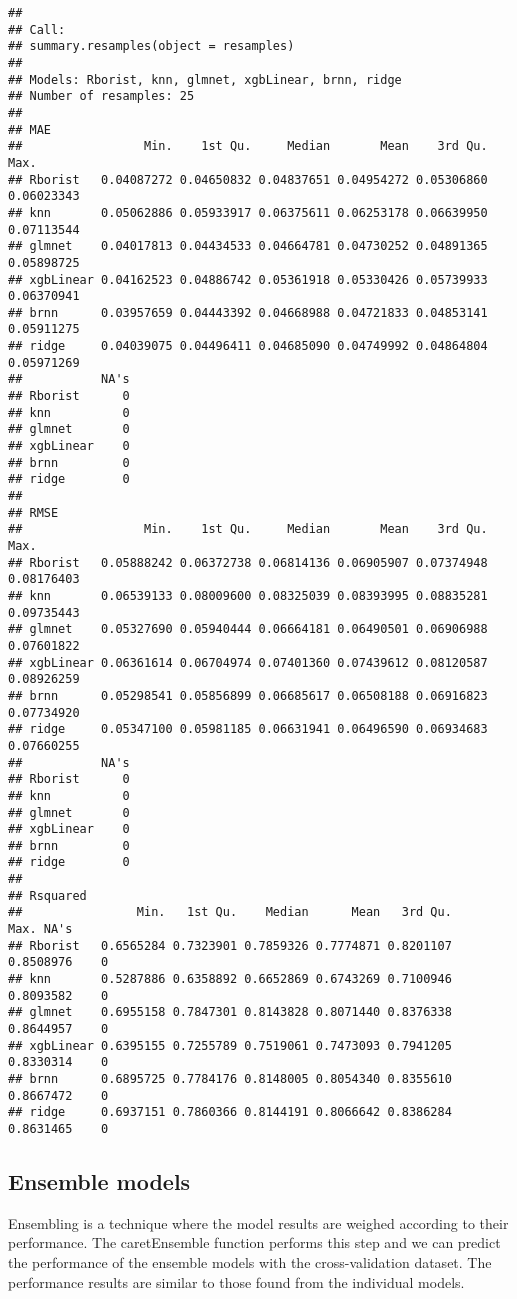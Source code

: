 \documentclass[11pt,]{article}
\begin{document}
\begin{verbatim}
## 
## Call:
## summary.resamples(object = resamples)
## 
## Models: Rborist, knn, glmnet, xgbLinear, brnn, ridge 
## Number of resamples: 25 
## 
## MAE 
##                 Min.    1st Qu.     Median       Mean    3rd Qu.       Max.
## Rborist   0.04087272 0.04650832 0.04837651 0.04954272 0.05306860 0.06023343
## knn       0.05062886 0.05933917 0.06375611 0.06253178 0.06639950 0.07113544
## glmnet    0.04017813 0.04434533 0.04664781 0.04730252 0.04891365 0.05898725
## xgbLinear 0.04162523 0.04886742 0.05361918 0.05330426 0.05739933 0.06370941
## brnn      0.03957659 0.04443392 0.04668988 0.04721833 0.04853141 0.05911275
## ridge     0.04039075 0.04496411 0.04685090 0.04749992 0.04864804 0.05971269
##           NA's
## Rborist      0
## knn          0
## glmnet       0
## xgbLinear    0
## brnn         0
## ridge        0
## 
## RMSE 
##                 Min.    1st Qu.     Median       Mean    3rd Qu.       Max.
## Rborist   0.05888242 0.06372738 0.06814136 0.06905907 0.07374948 0.08176403
## knn       0.06539133 0.08009600 0.08325039 0.08393995 0.08835281 0.09735443
## glmnet    0.05327690 0.05940444 0.06664181 0.06490501 0.06906988 0.07601822
## xgbLinear 0.06361614 0.06704974 0.07401360 0.07439612 0.08120587 0.08926259
## brnn      0.05298541 0.05856899 0.06685617 0.06508188 0.06916823 0.07734920
## ridge     0.05347100 0.05981185 0.06631941 0.06496590 0.06934683 0.07660255
##           NA's
## Rborist      0
## knn          0
## glmnet       0
## xgbLinear    0
## brnn         0
## ridge        0
## 
## Rsquared 
##                Min.   1st Qu.    Median      Mean   3rd Qu.      Max. NA's
## Rborist   0.6565284 0.7323901 0.7859326 0.7774871 0.8201107 0.8508976    0
## knn       0.5287886 0.6358892 0.6652869 0.6743269 0.7100946 0.8093582    0
## glmnet    0.6955158 0.7847301 0.8143828 0.8071440 0.8376338 0.8644957    0
## xgbLinear 0.6395155 0.7255789 0.7519061 0.7473093 0.7941205 0.8330314    0
## brnn      0.6895725 0.7784176 0.8148005 0.8054340 0.8355610 0.8667472    0
## ridge     0.6937151 0.7860366 0.8144191 0.8066642 0.8386284 0.8631465    0
\end{verbatim}

\hypertarget{ensemble-models}{%
\subsection{Ensemble models}\label{ensemble-models}}

Ensembling is a technique where the model results are weighed according
to their performance. The caretEnsemble function performs this step and
we can predict the performance of the ensemble models with the
cross-validation dataset. The performance results are similar to those
found from the individual models.
\end{document}
